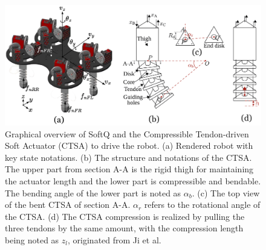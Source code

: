 \begin{figure}[htb]
    \centering
    \includegraphics[width=\linewidth]{img/chap3/robots.pdf}
    \caption{Graphical overview of SoftQ and the Compressible Tendon-driven Soft Actuator (CTSA) to drive the robot. (a) Rendered robot with key state notations. (b) The structure and notations of the CTSA. The upper part from section A-A is the rigid thigh for maintaining the actuator length and the lower part is compressible and bendable. The bending angle of the lower part is noted as $\alpha_b$. (c) The top view of the bent CTSA of section A-A. $\alpha_r$ refers to the rotational angle of the CTSA. (d) The CTSA compression is realized by pulling the three tendons by the same amount, with the compression length being noted as $z_l$, originated from Ji et al.\cite{jiSynthesizingOptimalGait2022, jiOmnidirectionalWalkingQuadruped2022}}
    \label{fig:robot}
\end{figure}